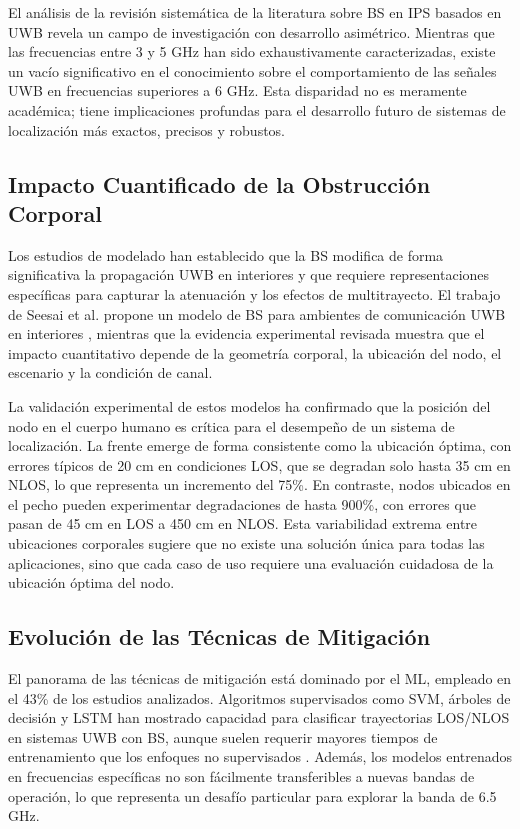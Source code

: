 El análisis de la revisión sistemática de la literatura sobre BS en IPS basados en UWB revela un campo de investigación con desarrollo asimétrico. Mientras que las frecuencias entre 3 y 5 GHz han sido exhaustivamente caracterizadas, existe un vacío significativo en el conocimiento sobre el comportamiento de las señales UWB en frecuencias superiores a 6 GHz. Esta disparidad no es meramente académica; tiene implicaciones profundas para el desarrollo futuro de sistemas de localización más exactos, precisos y robustos.

\subsection{Impacto Cuantificado de la Obstrucción Corporal}
\label{subsec:impacto_bs_cuantificado}

Los estudios de modelado han establecido que la BS modifica de forma significativa la propagación UWB en interiores y que requiere representaciones específicas para capturar la atenuación y los efectos de multitrayecto. El trabajo de Seesai et al. propone un modelo de BS para ambientes de comunicación UWB en interiores \cite{ref17}, mientras que la evidencia experimental revisada muestra que el impacto cuantitativo depende de la geometría corporal, la ubicación del nodo, el escenario y la condición de canal.

La validación experimental de estos modelos ha confirmado que la posición del nodo en el cuerpo humano es crítica para el desempeño de un sistema de localización. La frente emerge de forma consistente como la ubicación óptima, con errores típicos de 20 cm en condiciones LOS, que se degradan solo hasta 35 cm en NLOS, lo que representa un incremento del 75\%. En contraste, nodos ubicados en el pecho pueden experimentar degradaciones de hasta 900\%, con errores que pasan de 45 cm en LOS a 450 cm en NLOS. Esta variabilidad extrema entre ubicaciones corporales sugiere que no existe una solución única para todas las aplicaciones, sino que cada caso de uso requiere una evaluación cuidadosa de la ubicación óptima del nodo.

\subsection{Evolución de las Técnicas de Mitigación}
\label{subsec:evolucion_mitigacion}

El panorama de las técnicas de mitigación está dominado por el ML, empleado en el 43\% de los estudios analizados. Algoritmos supervisados como SVM, árboles de decisión y LSTM han mostrado capacidad para clasificar trayectorias LOS/NLOS en sistemas UWB con BS, aunque suelen requerir mayores tiempos de entrenamiento que los enfoques no supervisados \cite{ref20}. Además, los modelos entrenados en frecuencias específicas no son fácilmente transferibles a nuevas bandas de operación, lo que representa un desafío particular para explorar la banda de 6.5 GHz.

